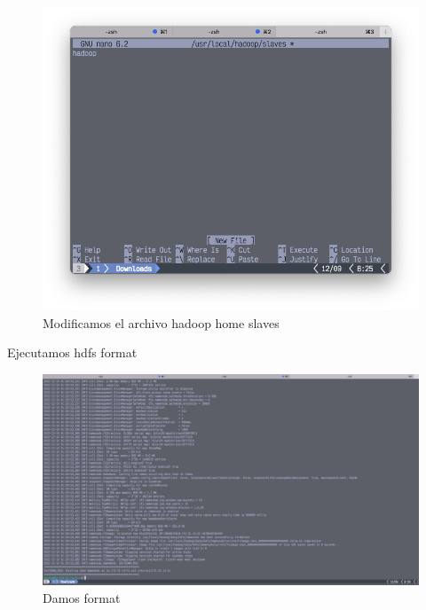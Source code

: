 \begin{figure}[h]
	\centering
	\includegraphics[scale=.35] {img/40-nano-hadoop_home-slaves}
	\caption{Modificamos el archivo hadoop home slaves}
	\label{fig:40}	
\end{figure}

Ejecutamos hdfs format
\begin{figure}[h]
	\centering
	\includegraphics[scale=.2] {img/41-hdfs-format}
	\caption{Damos format}
	\label{fig:41}	
\end{figure}


